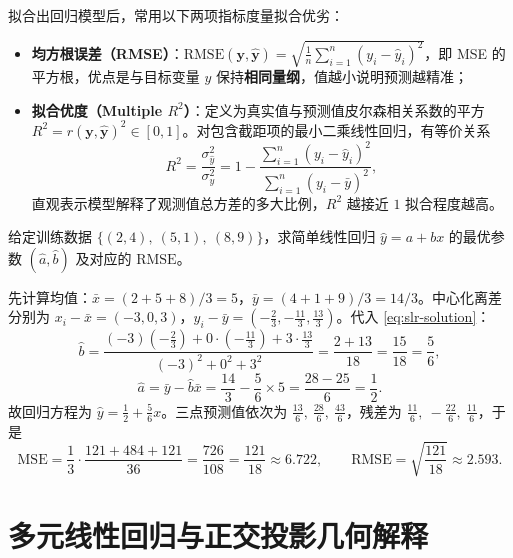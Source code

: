 拟合出回归模型后，常用以下两项指标度量拟合优劣：
\begin{itemize}
  \item \textbf{均方根误差（RMSE）}：$\mathrm{RMSE}(\bm{y}, \hat{\bm{y}}) = \sqrt{\frac{1}{n}\sum_{i=1}^{n}(y_i - \hat{y}_i)^2}$，即 MSE 的平方根，优点是与目标变量 $y$ 保持\textbf{相同量纲}，值越小说明预测越精准；
  \item \textbf{拟合优度（Multiple $R^2$）}：定义为真实值与预测值皮尔森相关系数的平方 $R^2 = r(\bm{y}, \hat{\bm{y}})^2 \in [0, 1]$。对包含截距项的最小二乘线性回归，有等价关系
  \begin{equation}\label{eq:r-squared}
    R^2 = \frac{\sigma_{\hat{y}}^2}{\sigma_y^2} = 1 - \frac{\sum_{i=1}^{n}(y_i - \hat{y}_i)^2}{\sum_{i=1}^{n}(y_i - \bar{y})^2},
  \end{equation}
  直观表示模型解释了观测值总方差的多大比例，$R^2$ 越接近 $1$ 拟合程度越高。
\end{itemize}

\begin{example}[title={三点数据集的简单线性回归手算}]\label{eg:slr-three-points}
给定训练数据 $\{(2, 4),\ (5, 1),\ (8, 9)\}$，求简单线性回归 $\hat{y} = a + bx$ 的最优参数 $(\hat{a}, \hat{b})$ 及对应的 $\mathrm{RMSE}$。
\begin{solution}
先计算均值：$\bar{x} = (2+5+8)/3 = 5$，$\bar{y} = (4+1+9)/3 = 14/3$。中心化离差分别为 $x_i - \bar{x} = (-3, 0, 3)$，$y_i - \bar{y} = (-\frac{2}{3}, -\frac{11}{3}, \frac{13}{3})$。代入 \cref{eq:slr-solution}：
\[
  \hat{b} = \frac{(-3)(-\frac{2}{3}) + 0\cdot(-\frac{11}{3}) + 3\cdot\frac{13}{3}}{(-3)^2 + 0^2 + 3^2}
  = \frac{2 + 13}{18} = \frac{15}{18} = \frac{5}{6},
\]
\[
  \hat{a} = \bar{y} - \hat{b}\bar{x} = \frac{14}{3} - \frac{5}{6}\times 5 = \frac{28 - 25}{6} = \frac{1}{2}.
\]
故回归方程为 $\hat{y} = \frac{1}{2} + \frac{5}{6}x$。三点预测值依次为 $\frac{13}{6},\ \frac{28}{6},\ \frac{43}{6}$，残差为 $\frac{11}{6},\ -\frac{22}{6},\ \frac{11}{6}$，于是
\[
  \mathrm{MSE} = \frac{1}{3}\cdot\frac{121 + 484 + 121}{36} = \frac{726}{108} = \frac{121}{18} \approx 6.722,\qquad
  \mathrm{RMSE} = \sqrt{\frac{121}{18}} \approx 2.593.
\]
\end{solution}
\end{example}

\section{多元线性回归与正交投影几何解释}\label{sec:mlr}

